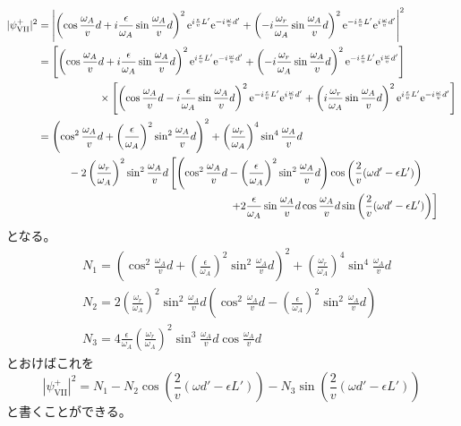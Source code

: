 \begin{align}
|\psi_\mathrm{VII}^+|^2&=\Biggl| \left(\cos \frac{\omega_A}{v}d +i\frac{\epsilon}{\omega_A} \sin \frac{\omega_A}{v}d\right)^2\e^{i\frac{\epsilon}{v}L'}\e^{-i\frac{\omega}{v}d'} +\left(-i \frac{\omega_r}{\omega_A} \sin \frac{\omega_A}{v}d\right)^2\e^{-i\frac{\epsilon}{v}L'}\e^{i\frac{\omega}{v}d'} \Biggr|^2 \notag \\
&=\left[\left(\cos \frac{\omega_A}{v}d +i\frac{\epsilon}{\omega_A} \sin \frac{\omega_A}{v}d\right)^2\e^{i\frac{\epsilon}{v}L'}\e^{-i\frac{\omega}{v}d'} +\left(-i \frac{\omega_r}{\omega_A} \sin \frac{\omega_A}{v}d\right)^2\e^{-i\frac{\epsilon}{v}L'}\e^{i\frac{\omega}{v}d'}\right] \notag\\
&\hspace{2cm} \times \left[\left(\cos \frac{\omega_A}{v}d -i\frac{\epsilon}{\omega_A} \sin \frac{\omega_A}{v}d\right)^2\e^{-i\frac{\epsilon}{v}L'}\e^{i\frac{\omega}{v}d'} +\left(i \frac{\omega_r}{\omega_A} \sin \frac{\omega_A}{v}d\right)^2\e^{i\frac{\epsilon}{v}L'}\e^{-i\frac{\omega}{v}d'}\right] \notag \\
&=\left(\cos^2 \frac{\omega_A}{v}d +\left(\frac{\epsilon}{\omega_A}\right)^2 \sin^2 \frac{\omega_A}{v}d\right)^2+\left(\frac{\omega_r}{\omega_A}\right)^4 \sin^4 \frac{\omega_A}{v}d \notag \\
&\hspace{1cm}  -2\left(\frac{\omega_r}{\omega_A}\right)^2\sin^2\frac{\omega_A}{v}d \left[\left(\cos^2 \frac{\omega_A}{v}d -\left(\frac{\epsilon}{\omega_A}\right)^2 \sin^2 \frac{\omega_A}{v}d\right) \cos \left(\frac{2}{v}(\omega d'-\epsilon L')\right) \right. \notag \\
&\hspace{6.3cm} \left.+2 \frac{\epsilon}{\omega_A} \sin \frac{\omega_A}{v}d \cos \frac{\omega_A}{v}d \sin \left(\frac{2}{v}(\omega d'-\epsilon L')\right)\right]
\end{align}
となる。
\begin{align}
&N_1 = \left(\cos^2 \frac{\omega_A}{v}d +\left(\frac{\epsilon}{\omega_A}\right)^2 \sin^2 \frac{\omega_A}{v}d\right)^2+\left(\frac{\omega_r}{\omega_A}\right)^4 \sin^4 \frac{\omega_A}{v}d \\
&N_2 = 2\left(\frac{\omega_r}{\omega_A}\right)^2\sin^2\frac{\omega_A}{v}d \left(\cos^2 \frac{\omega_A}{v}d -\left(\frac{\epsilon}{\omega_A}\right)^2 \sin^2 \frac{\omega_A}{v}d\right) \\
&N_3 = 4\frac{\epsilon}{\omega_A} \left(\frac{\omega_r}{\omega_A}\right)^2\sin^3\frac{\omega_A}{v}d \cos \frac{\omega_A}{v}d
\end{align}
とおけばこれを
\begin{equation}
|\psi_\mathrm{VII}^+|^2 =N_1 -N_2 \cos \left(\frac{2}{v}(\omega d'-\epsilon L')\right)-N_3 \sin  \left(\frac{2}{v}(\omega d'-\epsilon L')\right) \label{Nonreso_interference2}
\end{equation}
と書くことができる。


